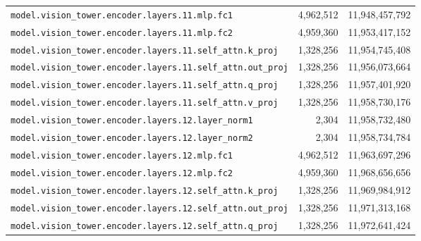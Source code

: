 \documentclass[10pt,a4paper]{article}
\theoremstyle{definition}
\begin{document}
\begin{appendices}
\begin{longtable}{p{9.5cm}rr}
\texttt{model.\allowbreak{}vision\_tower.\allowbreak{}encoder.\allowbreak{}layers.\allowbreak{}11.\allowbreak{}mlp.\allowbreak{}fc1} & 4,962,512 & 11,948,457,792 \\
\texttt{model.\allowbreak{}vision\_tower.\allowbreak{}encoder.\allowbreak{}layers.\allowbreak{}11.\allowbreak{}mlp.\allowbreak{}fc2} & 4,959,360 & 11,953,417,152 \\
\texttt{model.\allowbreak{}vision\_tower.\allowbreak{}encoder.\allowbreak{}layers.\allowbreak{}11.\allowbreak{}self\_attn.\allowbreak{}k\_proj} & 1,328,256 & 11,954,745,408 \\
\texttt{model.\allowbreak{}vision\_tower.\allowbreak{}encoder.\allowbreak{}layers.\allowbreak{}11.\allowbreak{}self\_attn.\allowbreak{}out\_proj} & 1,328,256 & 11,956,073,664 \\
\texttt{model.\allowbreak{}vision\_tower.\allowbreak{}encoder.\allowbreak{}layers.\allowbreak{}11.\allowbreak{}self\_attn.\allowbreak{}q\_proj} & 1,328,256 & 11,957,401,920 \\
\texttt{model.\allowbreak{}vision\_tower.\allowbreak{}encoder.\allowbreak{}layers.\allowbreak{}11.\allowbreak{}self\_attn.\allowbreak{}v\_proj} & 1,328,256 & 11,958,730,176 \\
\texttt{model.\allowbreak{}vision\_tower.\allowbreak{}encoder.\allowbreak{}layers.\allowbreak{}12.\allowbreak{}layer\_norm1} & 2,304 & 11,958,732,480 \\
\texttt{model.\allowbreak{}vision\_tower.\allowbreak{}encoder.\allowbreak{}layers.\allowbreak{}12.\allowbreak{}layer\_norm2} & 2,304 & 11,958,734,784 \\
\texttt{model.\allowbreak{}vision\_tower.\allowbreak{}encoder.\allowbreak{}layers.\allowbreak{}12.\allowbreak{}mlp.\allowbreak{}fc1} & 4,962,512 & 11,963,697,296 \\
\texttt{model.\allowbreak{}vision\_tower.\allowbreak{}encoder.\allowbreak{}layers.\allowbreak{}12.\allowbreak{}mlp.\allowbreak{}fc2} & 4,959,360 & 11,968,656,656 \\
\texttt{model.\allowbreak{}vision\_tower.\allowbreak{}encoder.\allowbreak{}layers.\allowbreak{}12.\allowbreak{}self\_attn.\allowbreak{}k\_proj} & 1,328,256 & 11,969,984,912 \\
\texttt{model.\allowbreak{}vision\_tower.\allowbreak{}encoder.\allowbreak{}layers.\allowbreak{}12.\allowbreak{}self\_attn.\allowbreak{}out\_proj} & 1,328,256 & 11,971,313,168 \\
\texttt{model.\allowbreak{}vision\_tower.\allowbreak{}encoder.\allowbreak{}layers.\allowbreak{}12.\allowbreak{}self\_attn.\allowbreak{}q\_proj} & 1,328,256 & 11,972,641,424 \\

\end{longtable}
\end{appendices}
\end{document}
